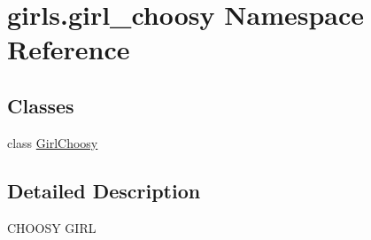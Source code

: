 \hypertarget{namespacegirls_1_1girl__choosy}{}\section{girls.\+girl\+\_\+choosy Namespace Reference}
\label{namespacegirls_1_1girl__choosy}
\subsection*{Classes}
\begin{DoxyCompactItemize}
\item 
class \hyperlink{classgirls_1_1girl__choosy_1_1_girl_choosy}{Girl\+Choosy}
\end{DoxyCompactItemize}


\subsection{Detailed Description}
\begin{DoxyVerb}CHOOSY GIRL\end{DoxyVerb}
 